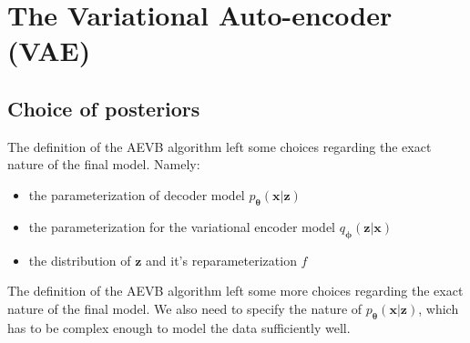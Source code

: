 \documentclass[12pt]{report}
\theoremstyle{definition}
\begin{document}
\section{The Variational Auto-encoder (VAE)}
\subsection{Choice of posteriors}

The definition of the AEVB algorithm left some choices regarding the exact nature of the final model. Namely:
\begin{itemize}
\item the parameterization of decoder model $p_{\pmb{\theta}}(\mathbf{x}|\mathbf{z})$
\item the parameterization for the variational encoder model $q_{\pmb{\phi}}(\mathbf{z}|\mathbf{x})$
\item the distribution of $\mathbf{z}$ and it's reparameterization $f$
\end{itemize}
The definition of the AEVB algorithm left some more choices regarding the exact nature of the final model. We also need to specify the nature of $p_{\pmb{\theta}}(\mathbf{x}|\mathbf{z})$, which has to be complex enough to model the  data sufficiently well. 
\end{document}

